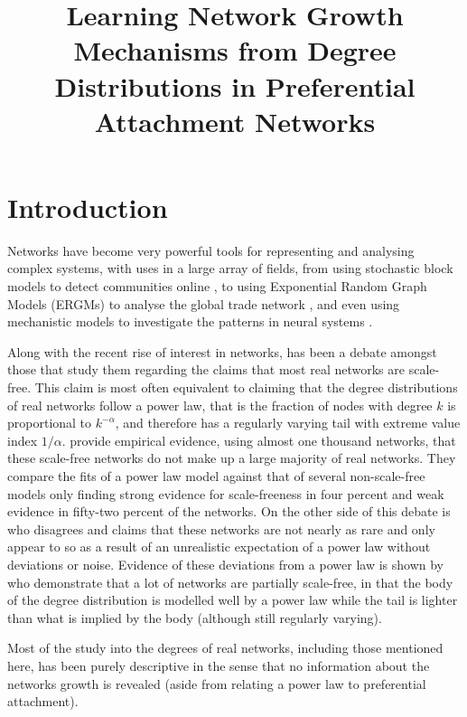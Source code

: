 \documentclass[
  sn-basic,
]{sn-jnl}
\title[Learning Network Growth Mechanisms from Degree Distributions in
Preferential Attachment Networks]{Learning Network Growth Mechanisms
from Degree Distributions in Preferential Attachment Networks}
\author[1]{\fnm{Thomas William} \sur{Boughen}}\author[1]{\fnm{Clement} \sur{Lee}}\author[1]{\fnm{Vianey Palacios} \sur{Ramirez}}
\affil[1]{\orgdiv{School of Mathematics, Statistics and
Physics}, \orgname{Newcastle University}}
\theoremstyle{plain}
\theoremstyle{plain}
\theoremstyle{remark}
\begin{document}
\maketitle


\newpage

\section{Introduction}\label{introduction}

Networks have become very powerful tools for representing and analysing
complex systems, with uses in a large array of fields, from using
stochastic block models to detect communities online \citep{Latouche11},
to using Exponential Random Graph Models (ERGMs) to analyse the global
trade network \citep{Setayesh22}, and even using mechanistic models to
investigate the patterns in neural systems \citep{Betzel17}.

Along with the recent rise of interest in networks, has been a debate
amongst those that study them regarding the claims that most real
networks are scale-free. This claim is most often equivalent to claiming
that the degree distributions of real networks follow a power law, that
is the fraction of nodes with degree \(k\) is proportional to
\(k^{-\alpha}\), and therefore has a regularly varying tail with extreme
value index \(1/\alpha\). \citet{Broido_2019} provide empirical
evidence, using almost one thousand networks, that these scale-free
networks do not make up a large majority of real networks. They compare
the fits of a power law model against that of several non-scale-free
models only finding strong evidence for scale-freeness in four percent
and weak evidence in fifty-two percent of the networks. On the other
side of this debate is \citet{Voitalov_2019} who disagrees and claims
that these networks are not nearly as rare and only appear to so as a
result of an unrealistic expectation of a power law without deviations
or noise. Evidence of these deviations from a power law is shown by
\citet{Lee24} who demonstrate that a lot of networks are partially
scale-free, in that the body of the degree distribution is modelled well
by a power law while the tail is lighter than what is implied by the
body (although still regularly varying).

Most of the study into the degrees of real networks, including those
mentioned here, has been purely descriptive in the sense that no
information about the networks growth is revealed (aside from relating a
power law to preferential attachment).
\end{document}
